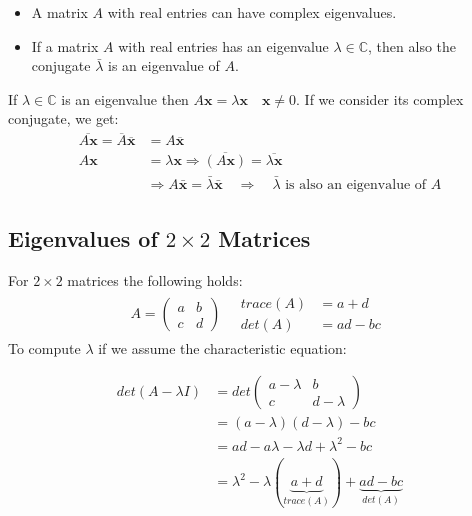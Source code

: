 \begin{itemize}
    \item A matrix \( A \) with real entries can have complex eigenvalues.
    \item If a matrix \( A \) with real entries has an eigenvalue \( \lambda \in \mathbb{C}\),
    then also the conjugate \(\bar{\lambda}\) is an eigenvalue of \( A \).
\end{itemize}
If \( \lambda \in \mathbb{C} \) is an eigenvalue then $ A\mathbf{x} = \lambda\mathbf{x} \quad \mathbf{x} \neq 0$. If we consider its complex conjugate, we get:
\begin{align*}
    \overline{A\mathbf{x}} = \overline{A}\overline{\mathbf{x}} &= A\overline{\mathbf{x}} \\
    A\mathbf{x} &= \lambda\mathbf{x} \Rightarrow\overline{(A\mathbf{x})} = \overline{\lambda\mathbf{x}} \\
    &\Rightarrow A\bar{\mathbf{x}} = \bar{\lambda}\bar{\mathbf{x}} \quad \Rightarrow \quad \bar{\lambda} \text{ is also an eigenvalue of } A
\end{align*}

\subsection{Eigenvalues of \( 2 \times 2 \) Matrices}
For \( 2 \times 2 \) matrices the following holds:
\begin{align*}
    A = \begin{pmatrix} a & b \\ c & d \end{pmatrix}
    \quad
    \begin{aligned}
        trace(A) &= a + d \\
        det(A) &= ad - bc\
    \end{aligned}
\end{align*}
To compute \( \lambda \) if we assume the characteristic equation:

\begin{align*}
    det(A - \lambda I) &= det \begin{pmatrix} a - \lambda & b \\ c & d - \lambda \end{pmatrix} \\
    &= (a - \lambda)(d - \lambda) - bc \\
    &= ad - a\lambda - \lambda d + \lambda^2 - bc \\
    &= \lambda^2 - \lambda(\underbrace{a + d}_{trace(A)}) + \underbrace{ad - bc}_{det(A)} \\
\end{align*}

